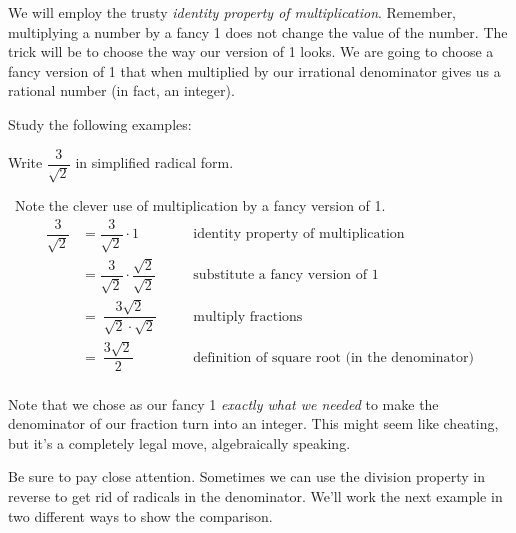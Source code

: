 We will employ the trusty \textit{identity property of multiplication}. Remember, multiplying a number by a fancy 1 does not change the value of the number. The trick will be to choose the way our version of 1 looks. We are going to choose a fancy version of 1 that when multiplied by our irrational denominator gives us a rational number (in fact, an integer).

Study the following examples:

\begin{boxedex}
Write $\dfrac{3}{\sqrt{2}}$ in simplified radical form.

\exsoln\ Note the clever use of multiplication by a fancy version of 1.
\[\begin{aligned}
\dfrac{3}{\sqrt{2}} &= \dfrac{3}{\sqrt{2}} \cdot 1
&&\quad\text{identity property of multiplication}\\
&= \dfrac{3}{\sqrt{2}} \cdot \dfrac{\sqrt{2}}{\sqrt{2}}
&&\quad\text{substitute a fancy version of 1}\\
&=~ \dfrac{3 \sqrt{2}}{\sqrt{2} \cdot \sqrt{2}}
&&\quad\text{multiply fractions}\\
&=~ \dfrac{3 \sqrt{2}}{2}
&&\quad\text{definition of square root (in the denominator)}\\
\end{aligned}
\]
\end{boxedex}

Note that we chose as our fancy 1 \textit{exactly what we needed} to make the denominator of our fraction turn into an integer. This might seem like cheating, but it's a completely legal move, algebraically speaking.

Be sure to pay close attention. Sometimes we can use the division property in reverse to get rid of radicals in the denominator. We'll work the next example in two different ways to show the comparison.

